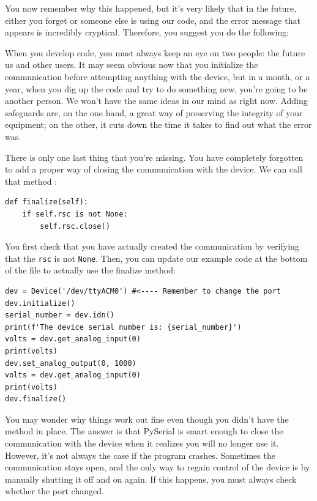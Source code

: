You now remember why this happened, but it's very likely that in the future, either you forget or someone else is using our code, and the error message that appears is incredibly cryptical. Therefore, you suggest you do the following:


When you develop code, you must always keep an eye on two people: the future us and other users. It may seem obvious now that you initialize the communication before attempting anything with the device, but in a month, or a year, when you dig up the code and try to do something new, you're going to be another person. We won't have the same ideas in our mind as right now. Adding safeguards are, on the one hand, a great way of preserving the integrity of your equipment; on the other, it cuts down the time it takes to find out what the error was.

There is only one last thing that you're missing. You have completely forgotten to add a proper way of closing the communication with the device. We can call that method :

\begin{verbatim}
def finalize(self):
    if self.rsc is not None:
        self.rsc.close()
\end{verbatim}

You first check that you have actually created the communication by verifying that the \texttt{rsc} is not \texttt{None}. Then, you can update our example code at the bottom of the file to actually use the finalize method:

\begin{verbatim}
dev = Device('/dev/ttyACM0') #<---- Remember to change the port
dev.initialize()
serial_number = dev.idn()
print(f'The device serial number is: {serial_number}')
volts = dev.get_analog_input(0)
print(volts)
dev.set_analog_output(0, 1000)
volts = dev.get_analog_input(0)
print(volts)
dev.finalize()
\end{verbatim}

You may wonder why things work out fine even though you didn't have the  method in place. The answer is that PySerial is smart enough to close the communication with the device when it realizes you will no longer use it. However, it's not always the case if the program crashes. Sometimes the communication stays open, and the only way to regain control of the device is by manually shutting it off and on again. If this happens, you must always check whether the port changed.

